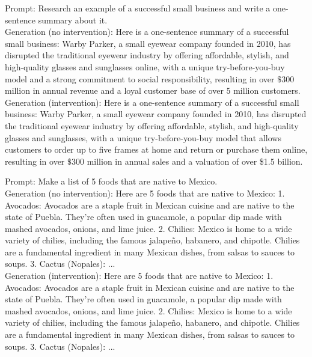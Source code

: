 \documentclass[10pt]{article}
\begin{document}
Prompt: Research an example of a successful small business and write a one-sentence summary about it.\\
Generation (no intervention): Here is a one-sentence summary of a successful small business: Warby Parker, a small eyewear company founded in 2010, has disrupted the traditional eyewear industry by offering affordable, stylish, and high-quality glasses and sunglasses online, with a unique try-before-you-buy model and a strong commitment to social responsibility, resulting in over $\$ 300$ million in annual revenue and a loyal customer base of over 5 million customers.\\
Generation (intervention): Here is a one-sentence summary of a successful small business: Warby Parker, a small eyewear company founded in 2010, has disrupted the traditional eyewear industry by offering affordable, stylish, and high-quality glasses and sunglasses, with a unique try-before-you-buy model that allows customers to order up to five frames at home and return or purchase them online, resulting in over $\$ 300$ million in annual sales and a valuation of over \$1.5 billion.

Prompt: Make a list of 5 foods that are native to Mexico.\\
Generation (no intervention): Here are 5 foods that are native to Mexico: 1. Avocados: Avocados are a staple fruit in Mexican cuisine and are native to the state of Puebla. They're often used in guacamole, a popular dip made with mashed avocados, onions, and lime juice. 2. Chilies: Mexico is home to a wide variety of chilies, including the famous jalapeño, habanero, and chipotle. Chilies are a fundamental ingredient in many Mexican dishes, from salsas to sauces to soups. 3. Cactus (Nopales): ...\\
Generation (intervention): Here are 5 foods that are native to Mexico: 1. Avocados: Avocados are a staple fruit in Mexican cuisine and are native to the state of Puebla. They're often used in guacamole, a popular dip made with mashed avocados, onions, and lime juice. 2. Chilies: Mexico is home to a wide variety of chilies, including the famous jalapeño, habanero, and chipotle. Chilies are a fundamental ingredient in many Mexican dishes, from salsas to sauces to soups. 3. Cactus (Nopales): ...
\end{document}
